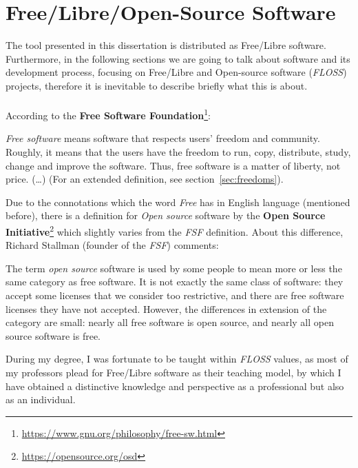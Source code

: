 \documentclass[a4paper, 12pt]{book}
\begin{document}
\section{Free/Libre/Open-Source Software}
\label{sec:floss-definition}
The tool presented in this dissertation is distributed as Free/Libre software. Furthermore, in the following sections we are going
to talk about software and its development process, focusing on Free/Libre and Open-source
software (\emph{FLOSS}) projects, therefore it is inevitable to describe briefly what this is about.\\\\
According to the \textbf{Free Software Foundation}\footnote{\url{https://www.gnu.org/philosophy/free-sw.html}}:
\begin{displayquote}
    \emph{Free software} means software that respects users' freedom and community. Roughly, it means that the users have the freedom
    to run, copy, distribute, study, change and improve the software. Thus, free software is a matter of liberty, not price. (\ldots)
    (For an extended definition, see section~\ref{sec:freedoms}).\\
\end{displayquote}
Due to the connotations which the word \emph{Free} has in English language (mentioned before), there is a definition
for \emph{Open source} software by the \textbf{Open Source Initiative}\footnote{\url{https://opensource.org/osd}} which
slightly varies from the \emph{FSF} definition. About this difference, Richard Stallman (founder of the \emph{FSF}) comments:
\begin{displayquote}
The term \emph{open source} software is used by some people to mean more or less the same category as free software.
It is not exactly the same class of software: they accept some licenses that we consider too restrictive,
and there are free software licenses they have not accepted. However, the differences in extension of the
category are small: nearly all free software is open source, and nearly all open source software is free.
\end{displayquote}
During my degree, I was fortunate to be taught within \emph{FLOSS} values, as most of my professors plead
for Free/Libre software as their teaching model, by which I have obtained a distinctive knowledge and perspective
as a professional but also as an individual.
\end{document}
